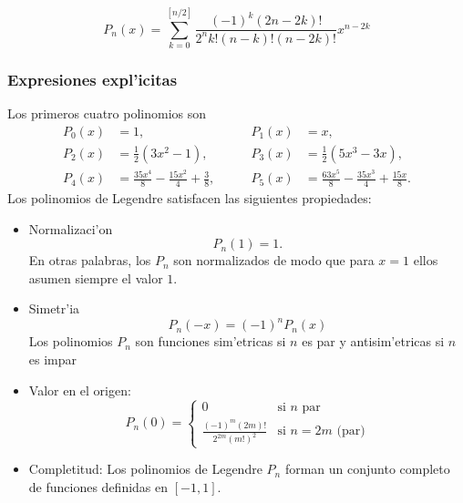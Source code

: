 \begin{equation}\label{seriePn}
P_n(x)= \sum_{k=0}^{[n/2]}\frac{(-1)^{k}(2n-2k)!}{2^nk!(n-k)!(n-2k)!}x^{n-2k}
\end{equation}

\subsubsection{Expresiones expl'icitas}
Los primeros cuatro polinomios son
 \begin{align*}
  P_0(x) &= 1, &P_1(x) &= x,\\
  P_2(x) &= \frac 12(3x^2-1), &P_3(x) &= \frac 12(5x^3-3x),\\
  P_4(x) &= \frac{35 x^{4}}{8} - \frac{15 x^{2}}{4} + \frac{3}{8}, \qquad 
  &P_5(x) &= \frac{63 x^{5}}{8} - \frac{35 x^{3}}{4} + \frac{15 x}{8}.
 \end{align*}
Los polinomios de Legendre satisfacen las siguientes propiedades:
\begin{itemize}
\item Normalizaci'on
\begin{equation}
     P_n(1) = 1.
\end{equation}
En otras palabras, los $P_n$ son normalizados de modo que para $x=1$ ellos
asumen siempre el valor $1$.
 \item Simetr'ia
\begin{equation}
P_n(-x) = (-1)^n P_n(x)
\end{equation}
Los polinomios $P_n$ son funciones sim'etricas si $n$ es par y antisim'etricas
si $n$ es impar

\item Valor en el origen:
\begin{equation}\label{Pn0}
P_n(0)=\left\{\begin{array}{cl}
0 & \text{si } n \text{ par} \\
\frac{(-1)^m(2m)!}{2^{2m}(m!)^2} & \text{si } n=2m \text{ (par)}
\end{array}\right.
\end{equation}

\item Completitud: Los polinomios de Legendre $P_n$ forman un conjunto
completo de funciones definidas en $[-1,1]$.
 \end{itemize}

